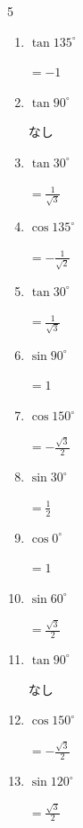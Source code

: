\begin{multicols}{5}
\begin{enumerate}
\columnbreak %

  \item $\displaystyle \tan{135^\circ}$

        $\displaystyle =-1$

  \item $\displaystyle \tan{90^\circ}$

        $\displaystyle なし$

  \item $\displaystyle \tan{30^\circ}$

        $\displaystyle =\frac{1}{\sqrt{3}}$

  \item $\displaystyle \cos{135^\circ}$

        $\displaystyle =-\frac{1}{\sqrt{2}}$

  \item $\displaystyle \tan{30^\circ}$

        $\displaystyle =\frac{1}{\sqrt{3}}$

  \item $\displaystyle \sin{90^\circ}$

        $\displaystyle =1$

  \item $\displaystyle \cos{150^\circ}$

        $\displaystyle =-\frac{\sqrt{3}}{2}$

  \item $\displaystyle \sin{30^\circ}$

        $\displaystyle =\frac{1}{2}$

  \item $\displaystyle \cos{0^\circ}$

        $\displaystyle =1$

  \item $\displaystyle \sin{60^\circ}$

        $\displaystyle =\frac{\sqrt{3}}{2}$

  \item $\displaystyle \tan{90^\circ}$

        $\displaystyle なし$

  \item $\displaystyle \cos{150^\circ}$

        $\displaystyle =-\frac{\sqrt{3}}{2}$

  \item $\displaystyle \sin{120^\circ}$

        $\displaystyle =\frac{\sqrt{3}}{2}$


\end{enumerate}
\end{multicols}
